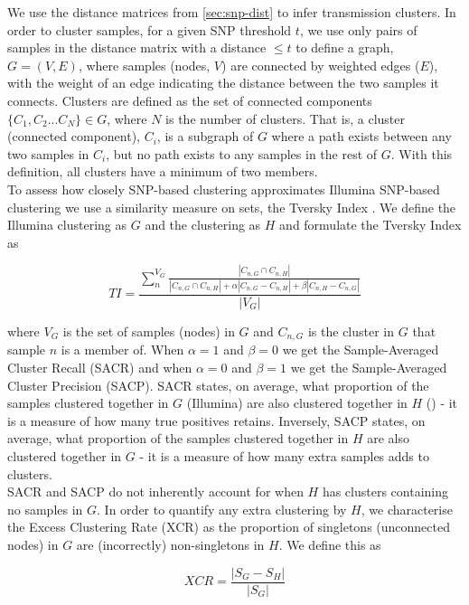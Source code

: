 We use the distance matrices from \autoref{sec:snp-dist} to infer transmission clusters. In order to cluster samples, for a given SNP threshold $t$, we use only pairs of samples in the distance matrix with a distance $\le t$ to define a graph, $G=(V,E)$, where samples (nodes, $V$) are connected by weighted edges ($E$), with the weight of an edge indicating the distance between the two samples it connects. Clusters are defined as the set of connected components $\{C_1, C_2...C_N\}\in G$, where $N$ is the number of clusters. That is, a cluster (connected component), $C_i$, is a subgraph of $G$ where a path exists between any two samples in $C_i$, but no path exists to any samples in the rest of $G$. With this definition, all clusters have a minimum of two members. \\
To assess how closely \ont{} SNP-based clustering approximates Illumina SNP-based clustering we use a similarity measure on sets, the Tversky Index \cite{tversky1977}. We define the Illumina clustering as $G$ and the \ont{} clustering as $H$ and formulate the Tversky Index as 

\begin{equation}
   TI=\frac{\sum_{n}^{V_G}\frac{\left|C_{n,G}\cap C_{n,H}\right|}{\left|C_{n,G}\cap C_{n,H}\right|+\alpha |C_{n,G}-C_{n,H}|+\beta |C_{n,H}-C_{n,G}|}}{|V_G|}
\end{equation}

where $V_G$ is the set of samples (nodes) in $G$ and $C_{n,G}$ is the cluster in $G$ that sample $n$ is a member of. When $\alpha = 1$ and $\beta=0$ we get the Sample-Averaged Cluster Recall (SACR) and when $\alpha = 0$ and $\beta = 1$ we get the Sample-Averaged Cluster Precision (SACP). SACR states, on average, what proportion of the samples clustered together in $G$ (Illumina) are also clustered together in $H$ (\ont{}) - it is a measure of how many true positives \ont{} retains. Inversely, SACP states, on average, what proportion of the samples clustered together in $H$ are also clustered together in $G$ - it is a measure of how many extra samples \ont{} adds to clusters. \\
SACR and SACP do not inherently account for when $H$ has clusters containing no samples in $G$. In order to quantify any extra clustering by $H$, we characterise the Excess Clustering Rate (XCR) as the proportion of singletons (unconnected nodes) in $G$ are (incorrectly) non-singletons in $H$. We define this as

\begin{equation}
\label{eq:xcr}
    XCR = \frac{|S_G-S_H|}{|S_G|}
\end{equation}

